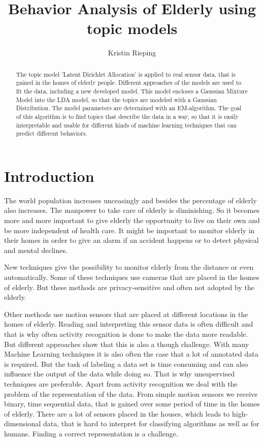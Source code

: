 \documentclass[11pt,a4paper]{article}
\title{Behavior Analysis of Elderly using topic models}
\author{Kristin Rieping}
\begin{document}
\maketitle
\pagebreak
\tableofcontents
\pagebreak

\begin{abstract}
The topic model 'Latent Dirichlet Allocation' is applied to real sensor data, that is gained in the homes of elderly people. Different approaches of the models are used to fit the data, including a new developed model. This model encloses a Gaussian Mixture Model into the LDA model, so that the topics are modeled with a Gaussian Distribution. The model parameters are determined with an EM-algorithm.
The goal of this algorithm is to find topics that describe the data in a way, so that it is easily interpretable and usable for different kinds of machine learning techniques that can predict different behaviors.
\end{abstract}


\section{Introduction}
The world population increases unceasingly and besides the percentage of elderly also increases. The manpower to take care of elderly is diminishing. So it becomes more and more important to give elderly the opportunity to live on their own and be more independent of health care. It might be important to monitor elderly in their homes in order to give an alarm if an accident happens or to detect physical and mental declines.

New techniques give the possibility to monitor elderly from the distance or even automatically. Some of these techniques use cameras that are placed in the homes of elderly. But these methods are privacy-sensitive and often not adopted by the elderly.

Other methods use motion sensors that are placed at different locations in the homes of elderly. %
Reading and interpreting this sensor data is often difficult and that is why often activity recognition is done to make the data more readable. But different approaches show that this is also a though challenge.
With many Machine Learning techniques it is also often the case that a lot of annotated data is required.  But the task of labeling a data set is time consuming and can also influence the output of the data while doing so. That is why unsupervised techniques are preferable. Apart from activity recognition we deal with the problem of the representation of the data. From simple motion sensors we receive binary, time sequential data, that is gained over some period of time in the homes of elderly. There are a lot of sensors placed in the houses, which leads to high-dimensional data, that is hard to interpret for classifying algorithms as well as for humans. Finding a correct representation is a challenge.\\
\end{document}
